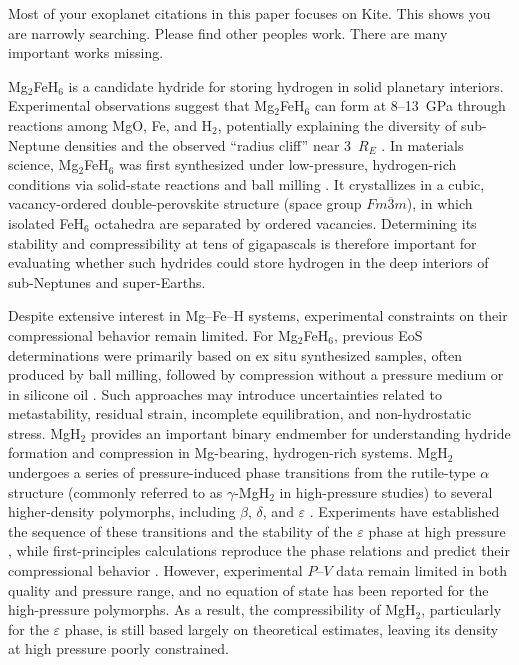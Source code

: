 \documentclass[draft,jgrga,12pt]{agujournal2019}
\begin{document}
\begin{cbox}
Most of your exoplanet citations in this paper focuses on Kite.  This shows you are narrowly searching.  Please find other peoples work.  There are many important works missing.\XWrevised    
\end{cbox}

Mg$_2$FeH$_6$ is a candidate hydride for storing hydrogen in solid planetary interiors. 
Experimental observations suggest that Mg$_2$FeH$_6$ can form at 8--13~{GPa} through reactions among MgO, Fe, and H$_2$, potentially explaining the diversity of sub-Neptune densities and the observed ``radius cliff'' near 3~$R_E$ \cite{kim_stability_2023}. 
In materials science, Mg$_2$FeH$_6$ was first synthesized under low-pressure, hydrogen-rich conditions via solid-state reactions and ball milling \cite{wang_preparation_2010, retuerto_highpressure_2010}. 
It crystallizes in a cubic, vacancy-ordered double-perovskite structure (space group $Fm\overline{3}m$), in which isolated FeH$_6$ octahedra are separated by ordered vacancies. 
Determining its stability and compressibility at tens of gigapascals is therefore important for evaluating whether such hydrides could store hydrogen in the deep interiors of sub-Neptunes and super-Earths.


Despite extensive interest in Mg--Fe--H systems, experimental constraints on their compressional behavior remain limited. 
For Mg$_2$FeH$_6$, previous EoS determinations were primarily based on ex situ synthesized samples, often produced by ball milling, followed by compression without a pressure medium or in silicone oil \cite{george_bulk_2009}. 
Such approaches may introduce uncertainties related to metastability, residual strain, incomplete equilibration, and non-hydrostatic stress.
MgH$_2$ provides an important binary endmember for understanding hydride formation and compression in Mg-bearing, hydrogen-rich systems. 
MgH$_2$ undergoes a series of pressure-induced phase transitions from the rutile-type $\alpha$ structure (commonly referred to as $\gamma$-MgH$_2$ in high-pressure studies) to several higher-density polymorphs, including $\beta$, $\delta$, and $\varepsilon$ \cite{moriwaki_structural_2006, vajeeston_structural_2006, cui_structural_2008}. 
Experiments have established the sequence of these transitions and the stability of the $\varepsilon$ phase at high pressure \cite{moriwaki_structural_2006}, while first-principles calculations reproduce the phase relations and predict their compressional behavior \cite{cui_structural_2008}. 
However, experimental $P$--$V$ data remain limited in both quality and pressure range, and no equation of state has been reported for the high-pressure polymorphs. 
As a result, the compressibility of MgH$_2$, particularly for the $\varepsilon$ phase, is still based largely on theoretical estimates, leaving its density at high pressure poorly constrained.
\end{document}
